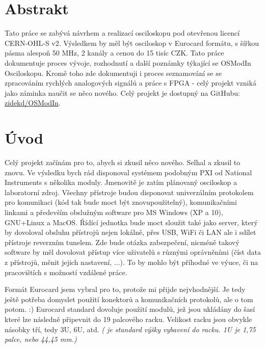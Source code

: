 \documentclass[12pt]{article}
\begin{document}
\newpage

\section{Abstrakt}

Tato práce se zabývá návrhem a realizací osciloskopu pod otevřenou licencí CERN-OHL-S v2.
Výsledkem by měl být osciloskop v Eurocard formátu, s šířkou pásma alespoň 50 MHz, 
2 kanály a cenou do 15 tisíc CZK. Tato práce dokumentuje proces vývoje,
rozhodnutí a další poznámky týkající se OSModIn Osciloskopu. Kromě toho zde
dokumentuji i proces seznamování se se zpracováním rychlých analogových
signálů a práce s FPGA - celý projekt vzniká jako záminka naučit se něco nového.
Celý projekt je dostupný na GitHubu:
\href{https://github.com/zidekd/OSModIn}{zidekd/OSModIn}.

\newpage

\section{Úvod}

Celý projekt začínám pro to, abych si zkusil něco nového.
Selhal a zkusil to znovu. Ve výsledku bych rád disponoval systémem
podobným PXI od National Instruments s několika moduly.
Jmenovitě je zatím plánovaný osciloskop a laboratorní zdroj.
Všechny přístroje budou disponovat univerzálním protokolem pro
komunikaci (kód tak bude moct být znovupoužitelný), komunikačními
linkami a především obslužným software pro MS Windows (XP a 10),
GNU+Linux a MacOS. Řídící jednotka bude moct sloužit také jako server,
který by dovoloval obsluhu přístrojů nejen lokálně, přes USB, WiFi či LAN
ale i sdílet přístroje reverzním tunelem. Zde bude otázka zabezpečení,
nicméně takový software by měl dovolovat přístup více uživatelů s
různými oprávněními (číst data z přístrojů, měnit jejich nastavení, ...).
To by mohlo být příhodné ve výuce, či na pracovištích s možností vzdálené práce.

Formát Eurocard jsem vybral pro to, protože mi přijde nejvhodnější.
Je tedy ještě potřeba domyslet použití konektorů a komunikačních protokolů,
ale o tom potom. :) Eurocard standard dovoluje použití modulů, jež jsou
ukládány do šasí které lze následně připevnit do 19 palcového racku. Velikost
racku jsou obvykle násobky tří, tedy 3U, 6U, atd.
\emph{( je standard výšky vybavení do racku. 1U je 1,75 palce, nebo 44,45 mm.)}
\end{document}
